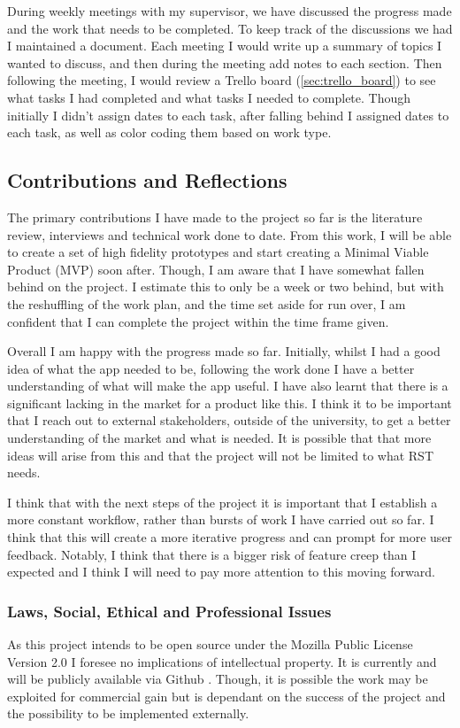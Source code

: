 \documentclass [11pt,a4paper]{article}
\begin{document}
During weekly meetings with my supervisor, we have discussed the progress made and the work that needs to be completed. To keep track of the discussions we had I maintained a document. Each meeting I would write up a summary of topics I wanted to discuss, and then during the meeting add notes to each section. Then following the meeting, I would review a Trello board (\ref{sec:trello_board}) to see what tasks I had completed and what tasks I needed to complete. Though initially I didn't assign dates to each task, after falling behind I assigned dates to each task, as well as color coding them based on work type. 

\subsection{Contributions and Reflections}
\label{sec:contributions}
The primary contributions I have made to the project so far is the literature review, interviews and technical work done to date. From this work, I will be able to create a set of high fidelity prototypes and start creating a Minimal Viable Product (MVP) soon after. Though, I am aware that I have somewhat fallen behind on the project. I estimate this to only be a week or two behind, but with the reshuffling of the work plan, and the time set aside for run over, I am confident that I can complete the project within the time frame given.

Overall I am happy with the progress made so far. Initially, whilst I had a good idea of what the app needed to be, following the work done I have a better understanding of what will make the app useful. I have also learnt that there is a significant lacking in the market for a product like this.  I think it to be important that I reach out to external stakeholders, outside of the university, to get a better understanding of the market and what is needed. It is possible that that more ideas will arise from this and that the project will not be limited to what RST needs. 

I think that with the next steps of the project it is important that I establish a more constant workflow, rather than bursts of work I have carried out so far. I think that this will create a more iterative progress and can prompt for more user feedback. Notably, I think that there is a bigger risk of feature creep than I expected and I think I will need to pay more attention to this moving forward.

\subsubsection{Laws, Social, Ethical and Professional Issues}
\label{sec:computer_laws}
As this project intends to be open source under the Mozilla Public License Version 2.0 I foresee no implications of intellectual property. It is currently and will be publicly available via Github \cite{keeptrackgithub}. Though, it is possible the work may be exploited for commercial gain but is dependant on the success of the project and the possibility to be implemented externally.
\end{document}
